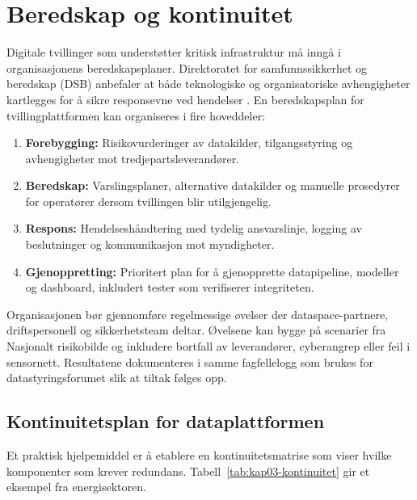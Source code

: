 \section{Beredskap og kontinuitet}
Digitale tvillinger som understøtter kritisk infrastruktur må inngå i organisasjonens beredskapsplaner. Direktoratet for
samfunnssikkerhet og beredskap (DSB) anbefaler at både teknologiske og organisatoriske avhengigheter kartlegges for å sikre
responsevne ved hendelser \citep{dsb2023nrb}. En beredskapsplan for tvillingplattformen kan organiseres i fire hoveddeler:
\begin{enumerate}
    \item \textbf{Forebygging:} Risikovurderinger av datakilder, tilgangsstyring og avhengigheter mot tredjepartsleverandører.
    \item \textbf{Beredskap:} Varslingsplaner, alternative datakilder og manuelle prosedyrer for operatører dersom tvillingen blir utilgjengelig.
    \item \textbf{Respons:} Hendelseshåndtering med tydelig ansvarslinje, logging av beslutninger og kommunikasjon mot myndigheter.
    \item \textbf{Gjenoppretting:} Prioritert plan for å gjenopprette datapipeline, modeller og dashboard, inkludert tester som verifiserer integriteten.
\end{enumerate}

Organisasjonen bør gjennomføre regelmessige øvelser der dataspace-partnere, driftspersonell og sikkerhetsteam deltar. Øvelsene
kan bygge på scenarier fra Nasjonalt risikobilde og inkludere bortfall av leverandører, cyberangrep eller feil i sensornett.
Resultatene dokumenteres i samme fagfellelogg som brukes for datastyringsforumet slik at tiltak følges opp.

\subsection{Kontinuitetsplan for dataplattformen}
Et praktisk hjelpemiddel er å etablere en kontinuitetsmatrise som viser hvilke komponenter som krever redundans. Tabell~\ref{tab:kap03-kontinuitet}
gir et eksempel fra energisektoren.


